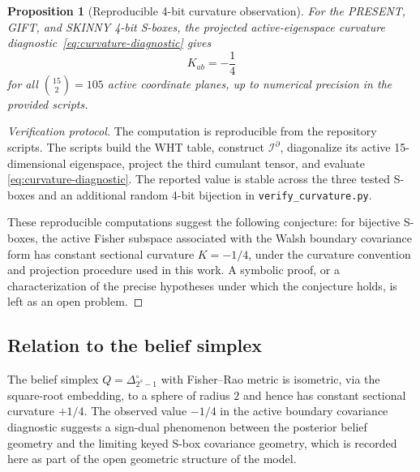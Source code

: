 \documentclass[referee,lineno,pdflatex,sn-mathphys-num]{sn-jnl}
\theoremstyle{thmstylethree}
\theoremstyle{thmstyletwo}
\theoremstyle{thmstyleone}
\newtheorem{proposition}{Proposition}[section]
\begin{document}
\begin{proposition}[Reproducible 4-bit curvature observation]\label{prop:empirical-curv}
For the PRESENT, GIFT, and SKINNY 4-bit S-boxes, the projected active-eigenspace
curvature diagnostic~\eqref{eq:curvature-diagnostic} gives
\begin{equation}\label{eq:empirical-minus-quarter}
  K_{ab}=-\frac14
\end{equation}
for all $\binom{15}{2}=105$ active coordinate planes, up to numerical precision
in the provided scripts.
\end{proposition}

\begin{proof}[Verification protocol]
The computation is reproducible from the repository scripts.  The scripts build
the WHT table, construct $\mathcal I^{\partial}$, diagonalize its active
15-dimensional eigenspace, project the third cumulant tensor, and evaluate
\eqref{eq:curvature-diagnostic}.  The reported value is stable across the three
tested S-boxes and an additional random 4-bit bijection in
\texttt{verify\_curvature.py}.

These reproducible computations suggest the following conjecture: for bijective
S-boxes, the active Fisher subspace associated with the Walsh boundary
covariance form has constant sectional curvature $K=-1/4$, under the curvature
convention and projection procedure used in this work.  A symbolic proof, or a
characterization of the precise hypotheses under which the conjecture holds, is
left as an open problem.
\end{proof}



\subsection{Relation to the belief simplex}\label{subsec:curvature-belief}

The belief simplex $Q=\Delta_{2^s-1}^{\circ}$ with Fisher--Rao metric is
isometric, via the square-root embedding, to a sphere of radius $2$ and hence
has constant sectional curvature $+1/4$.  The observed value $-1/4$ in the
active boundary covariance diagnostic suggests a sign-dual phenomenon between
the posterior belief geometry and the limiting keyed S-box covariance geometry,
which is recorded here as part of the open geometric structure of the model.

\end{document}
